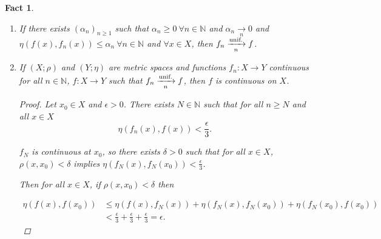 \documentclass[12pt]{amsbook}
\newtheorem{fact}[theorem]{Fact}
\theoremstyle{definition}
\newcommand{\NN}{{\mathbb N}}
\newcommand{\ra}{\rightarrow} %
\begin{document}
\begin{fact}
\begin{enumerate}
\item If there exists $(\alpha_n)_{n \geq 1}$ such that $\alpha_n \geq 0 \ \forall n \in \NN$ and $\alpha_n \xrightarrow[n]{} 0$ and $\eta(f(x), f_n(x)) \leq \alpha_n \ \forall n \in \NN$ and $\forall x \in X$, then $f_n \xrightarrow[n]{\textup{unif.}} f$.

\item If $(X; \rho)$ and $(Y; \eta)$ are metric spaces and functions $f_n: X \ra Y$ continuous for all $n \in \NN$, $f: X \ra Y$ such that $f_n \xrightarrow[n]{\textup{unif.}} f$, then $f$ is continuous on $X$.

\begin{proof}
Let $x_0 \in X$ and $\epsilon > 0$. There exists $N \in \NN$ such that for all $n \geq N$ and all $x \in X$
\begin{equation*} \eta(f_n(x),f(x)) < \frac{\epsilon}{3}. \end{equation*}


$f_N$ is continuous at $x_0$, so there exists $\delta > 0$ such that for all $x \in X$, $\rho(x, x_0) < \delta$ implies $\eta(f_N(x), f_N(x_0)) < \frac{\epsilon}{3}$.

Then for all $x \in X$, if $\rho(x, x_0) < \delta$ then

\begin{align*} 
\eta(f(x), f(x_0)) & \leq \eta(f(x), f_N(x)) + \eta(f_N(x), f_N(x_0)) + \eta(f_N(x_0), f(x_0)) \\
& < \frac{\epsilon}{3} + \frac{\epsilon}{3} + \frac{\epsilon}{3} = \epsilon.
\end{align*}
\end{proof}
\end{enumerate}
\end{fact}
\end{document}
